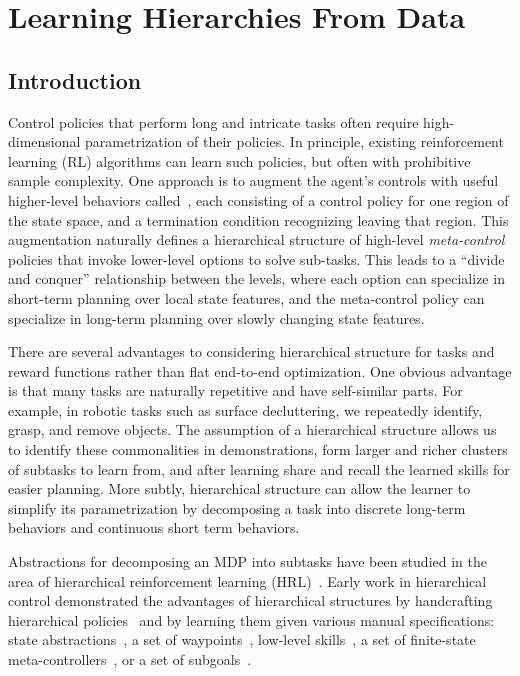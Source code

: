 \chapter{Learning Hierarchies From Data}
\setcounter{secnumdepth}{1}
\section{Introduction}
Control policies that perform long and intricate tasks often require high-dimensional parametrization of their policies.  In principle, existing reinforcement learning (RL) algorithms can learn such policies, but often with prohibitive sample complexity.
One approach is to augment the agent's controls with useful higher-level behaviors called~\cite{suttonPS99}, each consisting of a control policy for one region of the state space, and a termination condition recognizing leaving that region. This augmentation naturally defines a hierarchical structure of high-level \emph{meta-control} policies that invoke lower-level options to solve sub-tasks.
This leads to a ``divide and conquer'' relationship between the levels, where each option can specialize in short-term planning over local state features, and the meta-control policy can specialize in long-term planning over slowly changing state features.

There are several advantages to considering hierarchical structure for tasks and reward functions rather than flat end-to-end optimization.
One obvious advantage is that many tasks are naturally repetitive and have self-similar parts.
For example, in robotic tasks such as surface decluttering, we repeatedly identify, grasp, and remove objects.
The assumption of a hierarchical structure allows us to identify these commonalities in demonstrations, form larger and richer clusters of subtasks to learn from, and after learning share and recall the learned skills for easier planning.
More subtly, hierarchical structure can allow the learner to simplify its parametrization by decomposing a task into discrete long-term behaviors and continuous short term behaviors.

Abstractions for decomposing an MDP into subtasks have been studied in the area of hierarchical reinforcement learning (HRL)~\cite{parr98,suttonPS99,barto03}.
Early work in hierarchical control demonstrated the advantages of hierarchical structures by handcrafting hierarchical policies~\cite{brooks1986robust} and by learning them given various manual specifications: state abstractions~\cite{dayanH92,hengst02,kolterAN07,konidarisB07}, a set of waypoints~\cite{kaelbling93}, low-level skills~\cite{huberG97,baconP15,liaw17composing}, a set of finite-state meta-controllers~\cite{parrR97}, or a set of subgoals~\cite{suttonPS99,dietterich00}.

